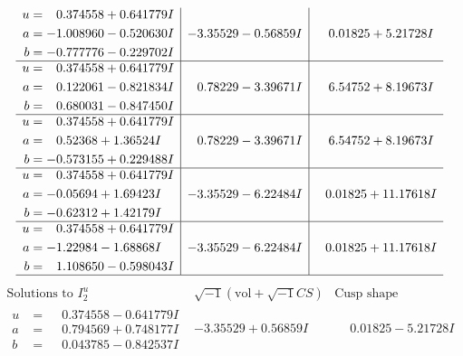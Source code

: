 \documentclass[1p]{elsarticle_modified}
\theoremstyle{definition}
\newcommand{\I}{\sqrt{-1}}
\begin{document}
$$\begin{array}{c|c|c}
\begin{aligned}
u &= \phantom{-}0.374558 + 0.641779 I \\
a &= -1.008960 - 0.520630 I \\
b &= -0.777776 - 0.229702 I\end{aligned}
 & -3.35529 - 0.56859 I & \phantom{-}0.01825 + 5.21728 I \\ \hline\begin{aligned}
u &= \phantom{-}0.374558 + 0.641779 I \\
a &= \phantom{-}0.122061 - 0.821834 I \\
b &= \phantom{-}0.680031 - 0.847450 I\end{aligned}
 & \phantom{-}0.78229 - 3.39671 I & \phantom{-}6.54752 + 8.19673 I \\ \hline\begin{aligned}
u &= \phantom{-}0.374558 + 0.641779 I \\
a &= \phantom{-}0.52368 + 1.36524 I \\
b &= -0.573155 + 0.229488 I\end{aligned}
 & \phantom{-}0.78229 - 3.39671 I & \phantom{-}6.54752 + 8.19673 I \\ \hline\begin{aligned}
u &= \phantom{-}0.374558 + 0.641779 I \\
a &= -0.05694 + 1.69423 I \\
b &= -0.62312 + 1.42179 I\end{aligned}
 & -3.35529 - 6.22484 I & \phantom{-}0.01825 + 11.17618 I \\ \hline\begin{aligned}
u &= \phantom{-}0.374558 + 0.641779 I \\
a &= -1.22984 - 1.68868 I \\
b &= \phantom{-}1.108650 - 0.598043 I\end{aligned}
 & -3.35529 - 6.22484 I & \phantom{-}0.01825 + 11.17618 I\\
 \hline 
 \end{array}$$\newpage$$\begin{array}{c|c|c}  
\text{Solutions to }I^u_{2}& \I (\text{vol} + \sqrt{-1}CS) & \text{Cusp shape}\\
 \hline 
\begin{aligned}
u &= \phantom{-}0.374558 - 0.641779 I \\
a &= \phantom{-}0.794569 + 0.748177 I \\
b &= \phantom{-}0.043785 - 0.842537 I\end{aligned}
 & -3.35529 + 0.56859 I & \phantom{-}0.01825 - 5.21728 I \\ \hline\begin{aligned}

\end{aligned}
\end{array}$$
\end{document}
